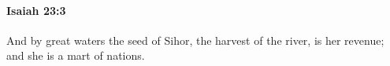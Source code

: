 
		\paragraph{Isaiah 23:3} %
			\label{ISAIAH-23-3}

			And by great waters the seed of Sihor, the harvest of the river, is her revenue; and she is a mart of nations.


